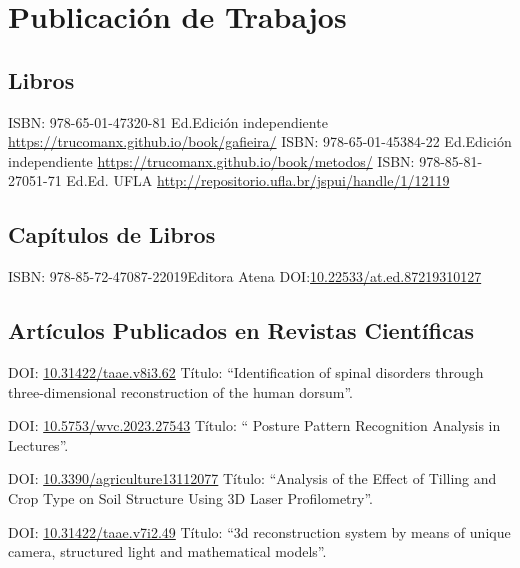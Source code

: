 \documentclass[11pt,a4paper,sans]{moderncv} %
\newcommand{\doiurl}[1]{\href{https://doi.org/#1}{#1}}
\begin{document}
\section{Publicación de Trabajos}
\subsection{Libros}
	      {ISBN: 978-65-01-47320-8}{1 Ed.}{Edición independiente}
	      {\url{https://trucomanx.github.io/book/gafieira/}}
	      {ISBN: 978-65-01-45384-2}{2 Ed.}{Edición independiente}
	      {\url{https://trucomanx.github.io/book/metodos/}}
	      {ISBN: 978-85-81-27051-7}{1 Ed.}{Ed. UFLA}
	      {\url{http://repositorio.ufla.br/jspui/handle/1/12119}}

\subsection{Capítulos de Libros}
	      {ISBN: 978-85-72-47087-2}{2019}{Editora Atena}
	      {DOI:\doiurl{10.22533/at.ed.87219310127}}

\subsection{Artículos Publicados en Revistas Científicas}

	      {DOI: \doiurl{10.31422/taae.v8i3.62} }{}{}
	      {Título: ``Identification of spinal disorders through three-dimensional reconstruction of the human dorsum''.}
	      
	      {DOI: \doiurl{10.5753/wvc.2023.27543} }{}{}
	      {Título: `` Posture Pattern Recognition Analysis in Lectures''.}
	      
	      {DOI: \doiurl{10.3390/agriculture13112077} }{}{}
	      {Título: ``Analysis of the Effect of Tilling and Crop Type on Soil Structure Using 3D Laser Profilometry''.}
	      
	      {DOI: \doiurl{10.31422/taae.v7i2.49} }{}{}
	      {Título: ``3d reconstruction system by means of unique camera, structured light and mathematical models''.}
\end{document}
